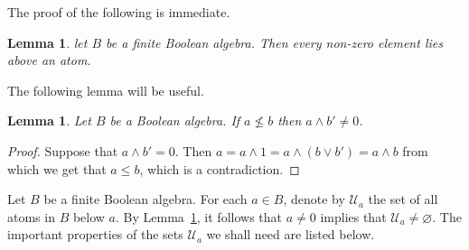 \documentclass[a4paper]{amsart}
\newtheorem{lemma}[theorem]{Lemma}
\begin{document}
The proof of the following is immediate.

\begin{lemma}\label{lem:atoms} let $B$ be a finite Boolean algebra.
Then every non-zero element lies above an atom.
\end{lemma}

The following lemma will be useful.

\begin{lemma}\label{lem:useful-one} Let $B$ be a Boolean algebra.
If $a \nleq b$ then $a \wedge b' \neq 0$.
\end{lemma}
\begin{proof}
Suppose that $a \wedge b' = 0$.
Then $a = a \wedge 1 = a \wedge (b \vee b') = a \wedge b$ from which we get that $a \leq b$, which is a contradiction.
\end{proof}

Let $B$ be a finite Boolean algebra.
For each $a \in B$, denote by $\mathscr{U}_{a}$ the set of all atoms in $B$ below $a$.
By Lemma~\ref{lem:atoms}, 
it follows that $a \neq 0$ implies that $\mathscr{U}_{a} \neq \varnothing$.
The important properties of the sets $\mathscr{U}_{a}$ we shall need are listed below.
\end{document}

